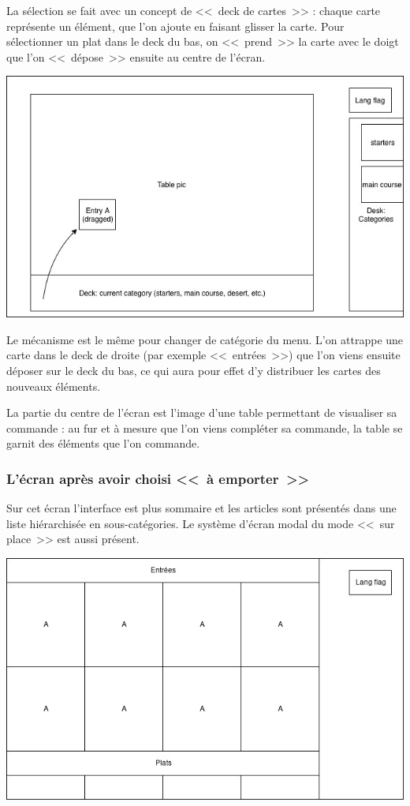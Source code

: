 \documentclass[a4paper,12pt]{article}
\begin{document}
La sélection se fait avec un concept de <<~deck de cartes~>> : chaque carte représente un élément, que l'on ajoute
en faisant glisser la carte. Pour sélectionner un plat dans le deck du bas, on <<~prend~>> la carte avec le doigt que
l'on <<~dépose~>> ensuite au centre de l'écran.

\begin{center}
	\includegraphics[width=\textwidth]{in_place_drag.jpg}
\end{center}

Le mécanisme est le même pour changer de catégorie du menu. L'on attrappe une carte dans le deck de droite (par
exemple <<~entrées~>>) que l'on viens ensuite déposer sur le deck du bas, ce qui aura pour effet d'y distribuer
les cartes des nouveaux éléments.

La partie du centre de l'écran est l'image d'une table permettant de visualiser sa commande : au fur et à mesure que
l'on viens compléter sa commande, la table se garnit des éléments que l'on commande.

\subsubsection{L'écran après avoir choisi <<~à emporter~>>}

Sur cet écran l'interface est plus sommaire et les articles sont présentés dans une liste hiérarchisée en
sous-catégories. Le système d'écran modal du mode <<~sur place~>> est aussi présent.

\begin{center}
	\includegraphics[width=\textwidth]{takeaway_screen.jpg}
\end{center}
\end{document}
